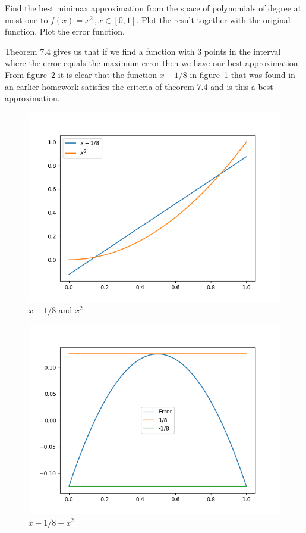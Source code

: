 \newpage

\begin{problem}
  Find the best minimax approximation from the space of polynomials of
  degree at most one to $f (x) = x^2 \, , x \in [0, 1]$. Plot the result
  together with the original function. Plot the error function.
\end{problem}

\begin{solution}
  Theorem 7.4 gives us that if we find a function with 3 points in the
  interval where the error equals the maximum error then we have our
  best approximation. From figure~\ref{fig:2:error} it is clear that
  the function $x - 1/8$ in figure~\ref{fig:2:approx} that was found
  in an earlier homework satisfies the criteria of theorem 7.4 and is
  this a best approximation.
  
  \begin{figure}[ht!]
    \centering 
    \includegraphics[scale = 0.5]{code/task_2_approximation.png}
    \caption{$x - 1/8$ and $x^2$}
    \label{fig:2:approx}
  \end{figure}

  \begin{figure}[ht!]
    \centering 
    \includegraphics[scale = 0.5]{code/task_2_error.png}
    \caption{$x - 1/8 - x^2$}
    \label{fig:2:error}
  \end{figure}

\end{solution}

